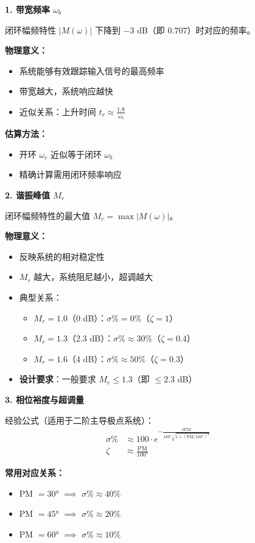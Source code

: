 \begin{minipage}[t]{0.52\textwidth}
\textbf{1. 带宽频率 $\omega_b$}

闭环幅频特性 $|M(\omega)|$ 下降到 $-3$ dB（即 $0.707$）时对应的频率。

\textbf{物理意义：}
\begin{itemize}
    \item 系统能够有效跟踪输入信号的最高频率
    \item 带宽越大，系统响应越快
    \item 近似关系：上升时间 $t_r \approx \frac{1.8}{\omega_b}$
\end{itemize}

\textbf{估算方法：}
\begin{itemize}
    \item 开环 $\omega_c$ 近似等于闭环 $\omega_b$
    \item 精确计算需用闭环频率响应
\end{itemize}

\vspace{0.3cm}
\textbf{2. 谐振峰值 $M_r$}

闭环幅频特性的最大值 $M_r = \max|M(\omega)|$。

\textbf{物理意义：}
\begin{itemize}
    \item 反映系统的相对稳定性
    \item $M_r$ 越大，系统阻尼越小，超调越大
    \item 典型关系：
    \begin{itemize}
        \item $M_r = 1.0$（0 dB）：$\sigma\% = 0\%$（$\zeta = 1$）
        \item $M_r = 1.3$（2.3 dB）：$\sigma\% \approx 30\%$（$\zeta = 0.4$）
        \item $M_r = 1.6$（4 dB）：$\sigma\% \approx 50\%$（$\zeta = 0.3$）
    \end{itemize}
    \item \textbf{设计要求}：一般要求 $M_r \leq 1.3$（即 $\leq 2.3$ dB）
\end{itemize}

\vspace{0.3cm}
\textbf{3. 相位裕度与超调量}

经验公式（适用于二阶主导极点系统）：
\begin{align*}
\sigma\% &\approx 100 \cdot e^{-\frac{\pi \text{PM}}{180°\sqrt{1+(\text{PM}/180°)^2}}} \\
\zeta &\approx \frac{\text{PM}}{100°}
\end{align*}

\textbf{常用对应关系：}
\begin{itemize}
    \item PM $= 30°$ $\implies$ $\sigma\% \approx 40\%$
    \item PM $= 45°$ $\implies$ $\sigma\% \approx 20\%$
    \item PM $= 60°$ $\implies$ $\sigma\% \approx 10\%$
\end{itemize}

\end{minipage}\hfill
